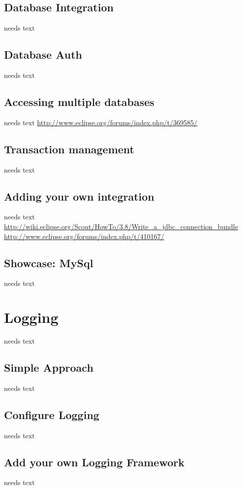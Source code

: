 \documentclass[a4paper,10pt,twoside]{book}
\begin{document}
\subsection{Database Integration}
needs text

\subsection{Database Auth}
needs text

\subsection{Accessing multiple databases}
needs text
\url{http://www.eclipse.org/forums/index.php/t/369585/}

\subsection{Transaction management}
needs text

\subsection{Adding your own integration}
needs text
\url{http://wiki.eclipse.org/Scout/HowTo/3.8/Write_a_jdbc_connection_bundle}
\url{http://www.eclipse.org/forums/index.php/t/410167/}

\subsection{Showcase: MySql}
needs text
  
\section{Logging}
needs text

\subsection{Simple Approach}
needs text
  
\subsection{Configure Logging}
needs text
  
\subsection{Add your own Logging Framework}
needs text
  
\end{document}
